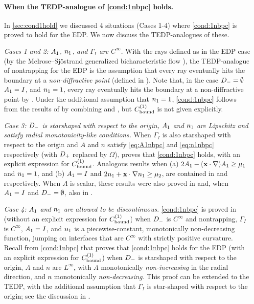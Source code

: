 \paragraph{When the TEDP-analogue of \cref{cond:1nbpc} holds.}

In \cref{sec:cond1hold} we discussed 4 situations (Cases 1-4) where \cref{cond:1nbpc} is proved to hold for the EDP. We now discuss the TEDP-analogues of these.

\emph{Cases 1 and 2: $A_{1}$, $n_{1}$, and $\Gamma_I$  are $C^\infty$.} 
With the rays defined as in the EDP case (by the Melrose--Sj{\"o}strand generalized bicharacteristic flow 
\cite[\S24.3]{Ho:85}), the TEDP-analogue of nontrapping for the EDP is the assumption that 
every ray eventually hits the boundary at a \emph{non-diffractive point} (defined in \cite[Page 1037]{BaLeRa:92}). Note that, in the case $D_{-}=\emptyset$ $A_{1}= I$, and $n_{1}=1$, every ray eventually hits the boundary at a non-diffractive point by \cite[Lemma 5.3]{BaSpWu:16}.
Under the additional assumption that $n_{1}= 1$, \cref{cond:1nbpc} follows from the results of \cite{BaLeRa:92} by combining \cite[Theorem 1.8]{BaSpWu:16} and \cite[Remark 5.6]{BaSpWu:16}, but $C^{(1)}_{\rm bound}$ is not given explicitly.

\emph{Case 3: $D_{-}$ is starshaped with respect to the origin, $A_{1}$ and $n_{1}$ are Lipschitz and satisfy radial monotonicity-like conditions.}
When $\Gamma_I$ is also starshaped with respect to the origin and $A$ and $n$ satisfy \cref{eq:A1nbpc} and \cref{eq:n1nbpc} respectively (with $D_{+}$ replaced by $\Omega$), 
\cite[Theorem A.6(i)]{GrPeSp:19} proves that
\cref{cond:1nbpc} holds, with an explicit expression for $C^{(1)}_{\rm bound}$. Analogous results when (a) $2A_{1} - (\mathbf{x}\cdot\nabla)A_{1} \geq \mu_1$ and $n_{1}= 1$,
and  (b) $A_{1}= I$ and  $2n_{1} + \mathbf{x} \cdot \nabla n_{1} \geq \mu_2$, 
are contained in \cite[Theorem A.6(ii)]{GrPeSp:19} and \cite[Theorem A.6(iii)]{GrPeSp:19} respectively.
When $A$ is scalar, these results were also proved in \cite[Theorem 1]{BrGaPe:17} and, when $A_{1}= I$ and $D_{-}=\emptyset$, also in \cite[Theorem 3.2]{GrSa:18}.

\emph{Case 4: %
 $A_{1}$ and $n_{1}$ are allowed to be discontinuous.}
\cref{cond:1nbpc} is proved in \cite{CaVo:10} (without an explicit expression for $C^{(1)}_{\rm bound}$) when $D_{-}$ is $C^\infty$ and nontrapping, $\Gamma_I$ is $C^\infty$, $A_{1}= I $, and $n_{1}$ is a piecewise-constant, monotonically non-decreasing function, jumping on interfaces that are $C^\infty$ with strictly positive curvature.
Recall from \cref{cond:1nbpc} that \cite[Theorem 2.7]{GrPeSp:19} proves that \cref{cond:1nbpc} holds for the EDP (with an explicit expression for $C^{(1)}_{\rm bound}$) when $D_{-}$ is starshaped with respect to the origin, $A$ and $n$ are $L^\infty$, with $A$ monotonically \emph{non-increasing} in the radial direction, and $n$ monotonically \emph{non-decreasing}. This proof can be extended to the TEDP, with the additional assumption that $\Gamma_I$ is star-shaped with respect to the origin; see the discussion in \cite[Section A.2]{GrPeSp:19}.


